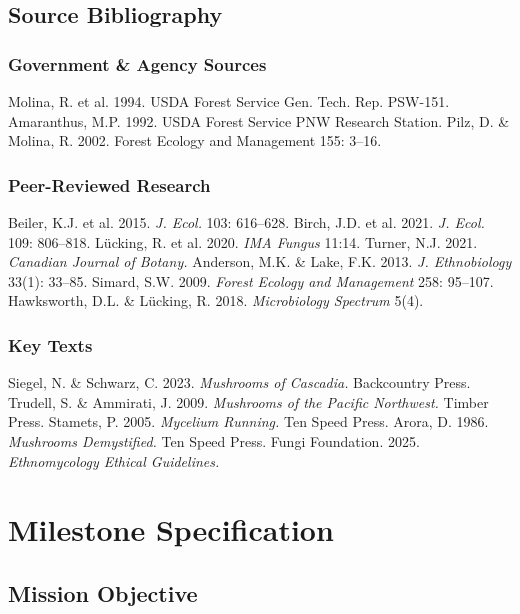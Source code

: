 \documentclass[11pt,letterpaper]{article}
\newcommand{\stageheader}[2]{%
  \noindent\colorbox{#2}{\makebox[\textwidth][l]{%
    \textcolor{white}{\bfseries\sffamily\hspace{6pt}#1\hspace{6pt}}}}%
  \vspace{0.5em}\par%
}
\begin{document}
\subsection{Source Bibliography}

\subsubsection{Government \& Agency Sources}
Molina, R. et al. 1994. USDA Forest Service Gen. Tech. Rep. PSW-151.
Amaranthus, M.P. 1992. USDA Forest Service PNW Research Station.
Pilz, D. \& Molina, R. 2002. Forest Ecology and Management 155: 3--16.

\subsubsection{Peer-Reviewed Research}
Beiler, K.J. et al. 2015. \textit{J. Ecol.} 103: 616--628.
Birch, J.D. et al. 2021. \textit{J. Ecol.} 109: 806--818.
Lücking, R. et al. 2020. \textit{IMA Fungus} 11:14.
Turner, N.J. 2021. \textit{Canadian Journal of Botany.}
Anderson, M.K. \& Lake, F.K. 2013. \textit{J. Ethnobiology} 33(1): 33--85.
Simard, S.W. 2009. \textit{Forest Ecology and Management} 258: 95--107.
Hawksworth, D.L. \& Lücking, R. 2018. \textit{Microbiology Spectrum} 5(4).

\subsubsection{Key Texts}
Siegel, N. \& Schwarz, C. 2023. \textit{Mushrooms of Cascadia.} Backcountry Press.
Trudell, S. \& Ammirati, J. 2009. \textit{Mushrooms of the Pacific Northwest.} Timber Press.
Stamets, P. 2005. \textit{Mycelium Running.} Ten Speed Press.
Arora, D. 1986. \textit{Mushrooms Demystified.} Ten Speed Press.
Fungi Foundation. 2025. \textit{Ethnomycology Ethical Guidelines.}

\newpage

\stageheader{STAGE 3 --- MISSION PACKAGE}{tertiary}

\section{Milestone Specification}

\subsection{Mission Objective}
\end{document}
